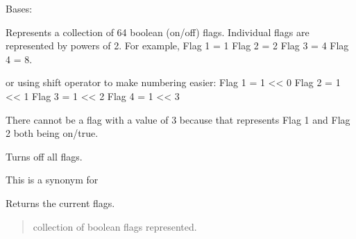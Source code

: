 \documentclass[letterpaper,10pt,english]{sphinxmanual}
\begin{document}
\begin{fulllineitems}
\label{\detokenize{apache_commons_validator_python.util:apache_commons_validator_python.util.flags.Flags}}
\pysigstartsignatures
{}
\pysigstopsignatures
\sphinxAtStartPar
Bases: 

\sphinxAtStartPar
Represents a collection of 64 boolean (on/off) flags.  Individual flags are
represented by powers of 2.  For example, Flag 1 = 1 Flag 2 = 2 Flag 3 = 4 Flag 4 =
8.

\sphinxAtStartPar
or using shift operator to make numbering easier:
Flag 1 = 1 \textless{}\textless{} 0
Flag 2 = 1 \textless{}\textless{} 1
Flag 3 = 1 \textless{}\textless{} 2
Flag 4 = 1 \textless{}\textless{} 3

\sphinxAtStartPar
There cannot be a flag with a value of 3 because that represents Flag 1
and Flag 2 both being on/true.

\begin{fulllineitems}
\label{\detokenize{apache_commons_validator_python.util:apache_commons_validator_python.util.flags.Flags.clear}}
\pysigstartsignatures
{}
\pysigstopsignatures
\sphinxAtStartPar
Turns off all flags.

\sphinxAtStartPar
This is a synonym for 

\end{fulllineitems}


\begin{fulllineitems}
\label{\detokenize{apache_commons_validator_python.util:apache_commons_validator_python.util.flags.Flags.flags}}
\pysigstartsignatures
{}
\pysigstopsignatures
\sphinxAtStartPar
Returns the current flags.
\begin{quote}\begin{description}
\sphinxAtStartPar
collection of boolean flags represented.


\end{description}
\end{quote}
\end{fulllineitems}
\end{fulllineitems}
\end{document}
